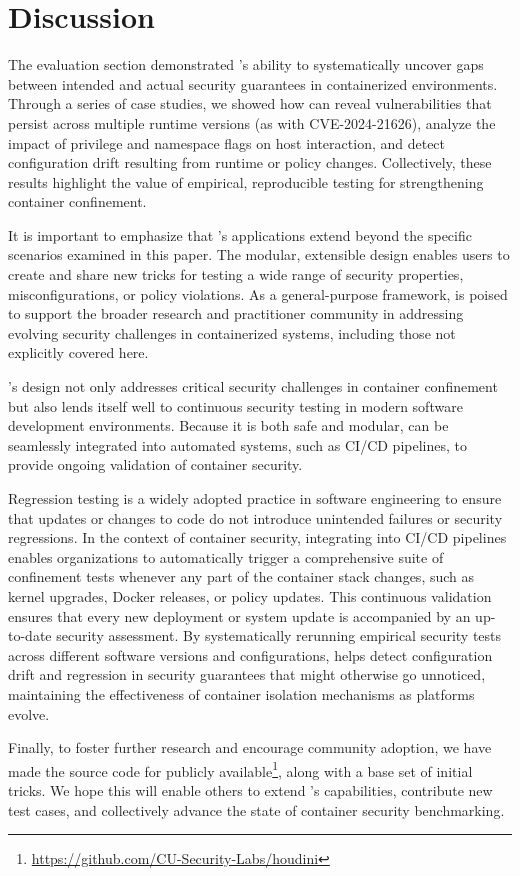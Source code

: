 \section{Discussion}
\label{sec:discussion}
The evaluation section demonstrated \houdini's ability to systematically uncover gaps between intended and actual security guarantees in containerized environments. Through a series of case studies, we showed how \houdini can reveal vulnerabilities that persist across multiple runtime versions (as with CVE-2024-21626), analyze the impact of privilege and namespace flags on host interaction, and detect configuration drift resulting from runtime or policy changes. Collectively, these results highlight the value of empirical, reproducible testing for strengthening container confinement.

It is important to emphasize that \houdini's applications extend beyond the specific scenarios examined in this paper. The modular, extensible design enables users to create and share new tricks for testing a wide range of security properties, misconfigurations, or policy violations. As a general-purpose framework, \houdini is poised to support the broader research and practitioner community in addressing evolving security challenges in containerized systems, including those not explicitly covered here.

\houdini's design not only addresses critical security challenges in container confinement but also lends itself well to continuous security testing in modern software development environments. Because it is both safe and modular, \houdini can be seamlessly integrated into automated systems, such as CI/CD pipelines, to provide ongoing validation of container security.

Regression testing is a widely adopted practice in software engineering to ensure that updates or changes to code do not introduce unintended failures or security regressions. In the context of container security, integrating \houdini into CI/CD pipelines enables organizations to automatically trigger a comprehensive suite of confinement tests whenever any part of the container stack changes, such as kernel upgrades, Docker releases, or policy updates. This continuous validation ensures that every new deployment or system update is accompanied by an up-to-date security assessment. By systematically rerunning empirical security tests across different software versions and configurations, \houdini helps detect configuration drift and regression in security guarantees that might otherwise go unnoticed, maintaining the effectiveness of container isolation mechanisms as platforms evolve.

Finally, to foster further research and encourage community adoption, we have made the source code for \houdini publicly available\footnote{\url{https://github.com/CU-Security-Labs/houdini}}, along with a base set of initial tricks. We hope this will enable others to extend \houdini's capabilities, contribute new test cases, and collectively advance the state of container security benchmarking.
